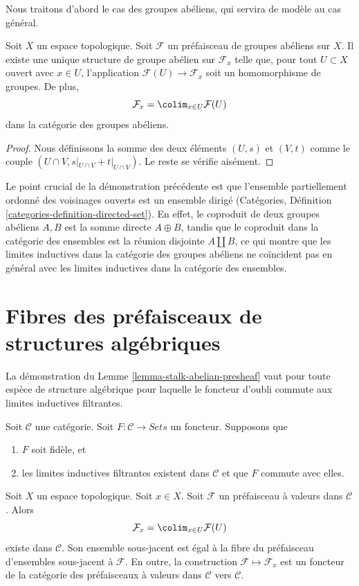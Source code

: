 \noindent
Nous traitons d'abord le cas des groupes abéliens, qui
servira de modèle au cas général.

\begin{lemma}
\label{lemma-stalk-abelian-presheaf}
Soit $X$ un espace topologique. Soit $\mathcal{F}$ un préfaisceau
de groupes abéliens sur $X$. Il existe une unique structure de
groupe abélien sur $\mathcal{F}_x$ telle que, pour tout
$U \subset X$ ouvert avec $x\in U$, l'application $\mathcal{F}(U) \to \mathcal{F}_x$
soit un homomorphisme de groupes. De plus,
$$
\mathcal{F}_x
=
\colim_{x\in U} \mathcal{F}(U)
$$
dans la catégorie des groupes abéliens.
\end{lemma}

\begin{proof}
Nous définissons la somme des deux éléments
$(U, s)$ et $(V, t)$ comme le couple $(U \cap V, s|_{U\cap V} +
t|_{U \cap V})$. Le reste se vérifie aisément.
\end{proof}

\noindent
Le point crucial de la démonstration précédente est que l'ensemble partiellement ordonné des
voisinages ouverts est un ensemble dirigé (Catégories, Définition
\ref{categories-definition-directed-set}). En effet, le coproduit
de deux groupes abéliens $A, B$ est la somme directe $A \oplus B$, tandis que
le coproduit dans la catégorie des ensembles est la réunion
disjointe $A \amalg B$, ce qui montre que les limites inductives dans la catégorie
des groupes abéliens ne coïncident pas en général avec les limites inductives dans la
catégorie des ensembles.


\section{Fibres des préfaisceaux de structures algébriques}
\label{section-stalks-presheaves-structures}

\noindent
La démonstration du Lemme \ref{lemma-stalk-abelian-presheaf} vaut
pour toute espèce de structure algébrique pour laquelle le foncteur
d'oubli commute aux limites inductives filtrantes.

\begin{lemma}
\label{lemma-stalk-presheaf-values-in-category}
Soit $\mathcal{C}$ une catégorie. Soit $F : \mathcal{C} \to \textit{Sets}$
un foncteur. Supposons que
\begin{enumerate}
\item $F$ soit fidèle, et
\item les limites inductives filtrantes existent dans $\mathcal{C}$ et que $F$ commute avec
elles.
\end{enumerate}
Soit $X$ un espace topologique. Soit $x \in X$. Soit $\mathcal{F}$
un préfaisceau à valeurs dans $\mathcal{C}$.
Alors
$$
\mathcal{F}_x = \colim_{x\in U} \mathcal{F}(U)
$$
existe dans $\mathcal{C}$. Son ensemble sous-jacent est égal à la
fibre du préfaisceau d'ensembles sous-jacent à $\mathcal{F}$.
En outre, la construction $\mathcal{F} \mapsto \mathcal{F}_x$
est un foncteur de la catégorie des préfaisceaux à valeurs dans
$\mathcal{C}$ vers $\mathcal{C}$.
\end{lemma}

